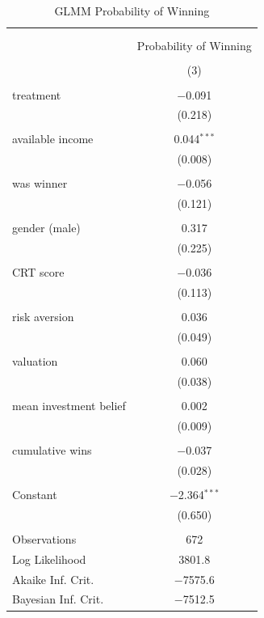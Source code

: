 \begin{appendices}
\begin{table}[!htbp] \centering 
  \caption{GLMM Probability of Winning} 
  \label{ax:glm_prob} 
\begin{tabular}{@{\extracolsep{5pt}}lc} 
\\[-1.8ex]\hline 
\hline \\[-1.8ex] 
\\[-1.8ex] & \multicolumn{1}{c}{Probability of Winning} \\ 
\\[-1.8ex] & (3)\\ 
\hline \\[-1.8ex] 
 treatment & $-$0.091 \\ 
  & (0.218) \\ 
  &  \\ 
 available income & 0.044$^{***}$  \\ 
  & (0.008) \\ 
  & \\ 
 was winner & $-$0.056 \\ 
  & (0.121) \\ 
  & \\ 
 gender (male) & 0.317\\ 
   & (0.225) \\ 
   & \\ 
 CRT score  & $-$0.036 \\ 
  & (0.113) \\ 
  & \\ 
 risk aversion & 0.036 \\ 
  & (0.049) \\ 
  & \\ 
 valuation & 0.060 \\ 
  & (0.038) \\ 
  & \\ 
 mean investment belief & 0.002 \\ 
  & (0.009) \\ 
  & \\
 cumulative wins & $-$0.037 \\ 
  & (0.028) \\ 
  & \\ 
 Constant & $-$2.364$^{***}$ \\ 
  & (0.650) \\ 
  & \\ 
  \hline
Observations & 672 \\ 
Log Likelihood & 3801.8 \\ 
Akaike Inf. Crit. & $-$7575.6 \\ 
Bayesian Inf. Crit. & $-$7512.5 \\

\end{tabular}
\end{table}
\end{appendices}
